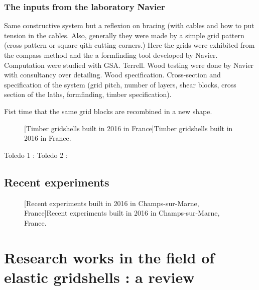 \subsubsection{The inputs from the laboratory Navier}

Same constructive system but a reflexion on bracing (with cables and how to put tension in the cables.
Also, generally they were made by a simple grid pattern (cross pattern or square qith cutting corners.)
Here the grids were exhibited from the compass method and the a formfinding tool developed by Navier.
Computation were studied with GSA. Terrell.
Wood testing were done by Navier with consultancy over detailing. Wood specification. Cross-section and specification of the system (grid pitch, number of layers, shear blocks, cross section of the laths, formfinding, timber specification).

Fist time that the same grid blocks are recombined in a new shape.
\begin{figure}[h]
		\hspace*{\fill}
		\vspace{10pt}
		[Timber gridshells built in 2016 in France]{Timber gridshells built in 2016 in France.}
		\label{fig:jpofav}    
\end{figure}


Toledo 1 : \cite{DAmico2014}
Toledo 2 : \cite{DAmico2015a}

\subsection{Recent experiments}

\begin{figure}[h]
		\hspace*{\fill}
		\vspace{10pt}
		[Recent experiments built in 2016 in Champs-sur-Marne, France]{Recent experiments built in 2016 in Champs-sur-Marne, France.}
		\label{fig:experiments}    
\end{figure}

\clearpage
\section{Research works in the field of elastic gridshells : a review}

